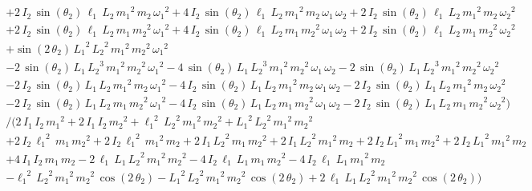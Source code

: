 \documentclass[a4paper,11pt]{jsarticle}
\begin{document}
\begin{align*}
      \\ & & &+
      2\,I_{2}\,\sin\left(\theta_2\right)\,\ell_{1}\,L_2\,{m_{1}}^2\,m_{2}\,{\omega _{1}}^2+
      4\,I_{2}\,\sin\left(\theta_2\right)\,\ell_{1}\,L_2\,{m_{1}}^2\,m_{2}\,\omega _{1}\,\omega _{2}+
      2\,I_{2}\,\sin\left(\theta_2\right)\,\ell_{1}\,L_2\,{m_{1}}^2\,m_{2}\,{\omega _{2}}^2
      \\ & & &+
      2\,I_{2}\,\sin\left(\theta_2\right)\,\ell_{1}\,L_2\,m_{1}\,{m_{2}}^2\,{\omega _{1}}^2+
      4\,I_{2}\,\sin\left(\theta_2\right)\,\ell_{1}\,L_2\,m_{1}\,{m_{2}}^2\,\omega _{1}\,\omega _{2}+
      2\,I_{2}\,\sin\left(\theta_2\right)\,\ell_{1}\,L_2\,m_{1}\,{m_{2}}^2\,{\omega _{2}}^2
      \\ & & &+
      \sin\left(2\,\theta_2\right)\,{L_1}^2\,{L_2}^2\,{m_{1}}^2\,{m_{2}}^2\,{\omega _{1}}^2
      \\ & & &-
      2\,\sin\left(\theta_2\right)\,L_1\,{L_2}^3\,{m_{1}}^2\,{m_{2}}^2\,{\omega _{1}}^2-
      4\,\sin\left(\theta_2\right)\,L_1\,{L_2}^3\,{m_{1}}^2\,{m_{2}}^2\,\omega _{1}\,\omega _{2}-
      2\,\sin\left(\theta_2\right)\,L_1\,{L_2}^3\,{m_{1}}^2\,{m_{2}}^2\,{\omega _{2}}^2
      \\ & & &-
      2\,I_{2}\,\sin\left(\theta_2\right)\,L_1\,L_2\,{m_{1}}^2\,m_{2}\,{\omega _{1}}^2-
      4\,I_{2}\,\sin\left(\theta_2\right)\,L_1\,L_2\,{m_{1}}^2\,m_{2}\,\omega _{1}\,\omega _{2}-
      2\,I_{2}\,\sin\left(\theta_2\right)\,L_1\,L_2\,{m_{1}}^2\,m_{2}\,{\omega _{2}}^2
      \\ & & &-
      2\,I_{2}\,\sin\left(\theta_2\right)\,L_1\,L_2\,m_{1}\,{m_{2}}^2\,{\omega _{1}}^2-
      4\,I_{2}\,\sin\left(\theta_2\right)\,L_1\,L_2\,m_{1}\,{m_{2}}^2\,\omega _{1}\,\omega _{2}-
      2\,I_{2}\,\sin\left(\theta_2\right)\,L_1\,L_2\,m_{1}\,{m_{2}}^2\,{\omega _{2}}^2
    \Bigg)
    \\
    & & &\Bigg/ \Bigg(
      2\,I_{1}\,I_{2}\,{m_{1}}^2+
      2\,I_{1}\,I_{2}\,{m_{2}}^2+
      {\ell_{1}}^2\,{L_2}^2\,{m_{1}}^2\,{m_{2}}^2+
      {L_1}^2\,{L_2}^2\,{m_{1}}^2\,{m_{2}}^2
      \\ & & &+
      2\,I_{2}\,{\ell_{1}}^2\,m_{1}\,{m_{2}}^2+
      2\,I_{2}\,{\ell_{1}}^2\,{m_{1}}^2\,m_{2}+
      2\,I_{1}\,{L_2}^2\,m_{1}\,{m_{2}}^2+
      2\,I_{1}\,{L_2}^2\,{m_{1}}^2\,m_{2}+
      2\,I_{2}\,{L_1}^2\,m_{1}\,{m_{2}}^2+
      2\,I_{2}\,{L_1}^2\,{m_{1}}^2\,m_{2}
      \\ & & &+
      4\,I_{1}\,I_{2}\,m_{1}\,m_{2}-
      2\,\ell_{1}\,L_1\,{L_2}^2\,{m_{1}}^2\,{m_{2}}^2-
      4\,I_{2}\,\ell_{1}\,L_1\,m_{1}\,{m_{2}}^2-
      4\,I_{2}\,\ell_{1}\,L_1\,{m_{1}}^2\,m_{2}
      \\ & & &-
      {\ell_{1}}^2\,{L_2}^2\,{m_{1}}^2\,{m_{2}}^2\,\cos\left(2\,\theta_2\right)-
      {L_1}^2\,{L_2}^2\,{m_{1}}^2\,{m_{2}}^2\,\cos\left(2\,\theta_2\right)+
      2\,\ell_{1}\,L_1\,{L_2}^2\,{m_{1}}^2\,{m_{2}}^2\,\cos\left(2\,\theta_2\right)
    \Bigg)
\end{align*}
\normalsize
\end{document}
